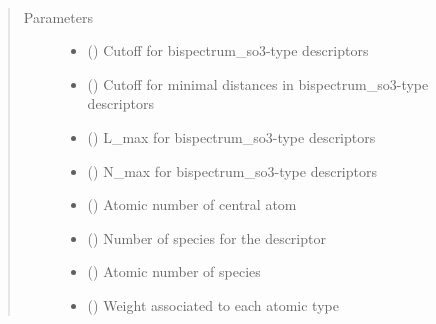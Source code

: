 \documentclass[letterpaper,10pt,english]{sphinxmanual}
\begin{document}

\begin{fulllineitems}
\label{\detokenize{descriptors:gap.descriptors.bispectrum_so3}}~\begin{quote}\begin{description}
\item[{Parameters}] \leavevmode\begin{itemize}
\item {} 
 () \textendash{} Cutoff for bispectrum\_so3-type descriptors

\item {} 
 () \textendash{} Cutoff for minimal distances in bispectrum\_so3-type descriptors

\item {} 
 () \textendash{} L\_max for bispectrum\_so3-type descriptors

\item {} 
 () \textendash{} N\_max for bispectrum\_so3-type descriptors

\item {} 
 () \textendash{} Atomic number of central atom

\item {} 
 () \textendash{} Number of species for the descriptor

\item {} 
 (\sphinxstyleliteralemphasis{\sphinxupquote{)}}) \textendash{} Atomic number of species

\item {} 
 (\sphinxstyleliteralemphasis{\sphinxupquote{)}}) \textendash{} Weight associated to each atomic type

\end{itemize}

\end{description}\end{quote}

\end{fulllineitems}
\end{document}
